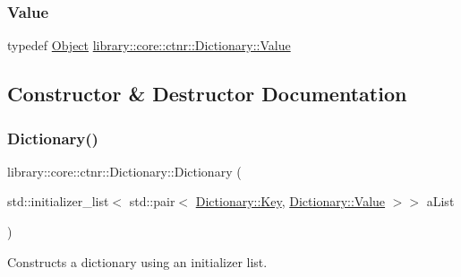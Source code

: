 \subsubsection{\texorpdfstring{Value}{Value}}
{\footnotesize\ttfamily typedef \mbox{\hyperlink{classlibrary_1_1core_1_1ctnr_1_1_object}{Object}} \mbox{\hyperlink{classlibrary_1_1core_1_1ctnr_1_1_dictionary_a3baf6692694e4fc27cb399ac083c88ea}{library\+::core\+::ctnr\+::\+Dictionary\+::\+Value}}}



\subsection{Constructor \& Destructor Documentation}
\mbox{\label{classlibrary_1_1core_1_1ctnr_1_1_dictionary_a823a08112d9ee271f9fa5833f030ea1a}} 
\subsubsection{\texorpdfstring{Dictionary()}{Dictionary()}\hspace{0.1cm}{\footnotesize\ttfamily [1/2]}}
{\footnotesize\ttfamily library\+::core\+::ctnr\+::\+Dictionary\+::\+Dictionary (\begin{DoxyParamCaption}\item[{std\+::initializer\+\_\+list$<$ std\+::pair$<$ \mbox{\hyperlink{classlibrary_1_1core_1_1ctnr_1_1_dictionary_a987cae687cce70d81a2a483c5e05e842}{Dictionary\+::\+Key}}, \mbox{\hyperlink{classlibrary_1_1core_1_1ctnr_1_1_dictionary_a3baf6692694e4fc27cb399ac083c88ea}{Dictionary\+::\+Value}} $>$$>$}]{a\+List }\end{DoxyParamCaption})}



Constructs a dictionary using an initializer list. 


\begin{DoxyCode}{0}
\end{DoxyCode}



